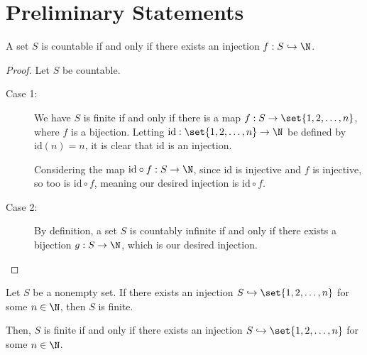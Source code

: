 \documentclass[10pt]{mypackage}
\begin{document}
\RaggedRight
\section{Preliminary Statements}%
\begin{theorem}
  A set $S$ is countable if and only if there exists an injection $f: S\hookrightarrow \N$.
\end{theorem}
\begin{proof}
  Let $S$ be countable.
  \begin{description}
    \item[Case 1:] We have $S$ is finite if and only if there is a map $f: S\rightarrow \set{1,2,\dots,n}$, where $f$ is a bijection. Letting $\text{id}: \set{1,2,\dots,n} \rightarrow \N$ be defined by $\text{id}(n) = n$, it is clear that $\text{id}$ is an injection.\newline

      Considering the map $\text{id}\circ f: S\rightarrow \N$, since $\text{id}$ is injective and $f$ is injective, so too is $\text{id}\circ f$, meaning our desired injection is $\text{id}\circ f$.
    \item[Case 2:] By definition, a set $S$ is countably infinite if and only if there exists a bijection $g: S\rightarrow \N$, which is our desired injection.
  \end{description}
\end{proof}
\begin{theorem}
  Let $S$ be a nonempty set. If there exists an injection $S\hookrightarrow \set{1,2,\dots,n}$ for some $n\in \N$, then $S$ is finite.

  Then, $S$ is finite if and only if there exists an injection $S\hookrightarrow \set{1,2,\dots,n}$ for some $n\in \N$.
\end{theorem}
\end{document}
